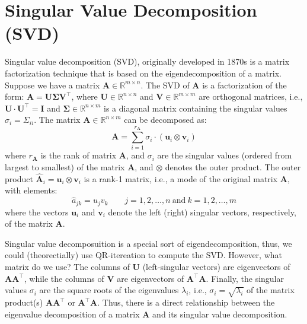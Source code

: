 \documentclass{article}[11pt]
\def\R{\mathbb{R}}
\begin{document}
\section{Singular Value Decomposition (SVD)}
Singular value decomposition (SVD), originally developed in 1870s \citep{Stewart:1993} is a matrix factorization technique that is based on the eigendecomposition of a matrix.
Suppose we have a matrix $\mathbf{A} \in \R^{m \times n}$. The SVD of $\mathbf{A}$ is a factorization of the form: $\mathbf{A} = \mathbf{U}\mathbf{\Sigma}\mathbf{V}^{\top}$, where
$\mathbf{U}\in\mathbb{R}^{n\times{n}}$ and $\mathbf{V}\in\mathbb{R}^{m\times{m}}$ are orthogonal matrices, i.e., $\mathbf{U}\cdot\mathbf{U}^{\top} = \mathbf{I}$ and $\mathbf{\Sigma}\in\mathbb{R}^{n\times{m}}$ is a diagonal matrix containing 
the singular values $\sigma_{i}=\Sigma_{ii}$. The matrix $\mathbf{A}\in\mathbb{R}^{n\times{m}}$ can be decomposed as:
\begin{equation*}
\mathbf{A} = \sum_{i=1}^{r_{\mathbf{A}}}\sigma_{i}\cdot\left(\mathbf{u}_{i}\otimes\mathbf{v}_{i}\right)
\end{equation*}
where $r_{\mathbf{A}}$ is the rank of matrix $\mathbf{A}$, and $\sigma_{i}$ are the singular values (ordered from largest to smallest) of the matrix $\mathbf{A}$,
and $\otimes$ denotes the outer product. 
The outer product $\hat{\mathbf{A}}_{i} = \mathbf{u}_{i}\otimes\mathbf{v}_{i}$ is a rank-1 matrix, i.e., a mode of the original matrix $\mathbf{A}$,  with elements: 
\begin{equation*}
\hat{a}_{jk} = u_{j}v_{k}\qquad{j=1,2,\dots,n~\text{and}~k=1,2,\dots,m}
\end{equation*}
where the vectors $\mathbf{u}_{i}$ and $\mathbf{v}_{i}$ denote the left (right) singular vectors, respectively, of the matrix $\mathbf{A}$.

Singular value decomposuition is a special sort of eigendecomposition, thus, we could (theorectially) use QR-itereation to compute the SVD. However, what matrix do we use?
The columns of $\mathbf{U}$ (left-singular vectors) are eigenvectors of $\mathbf{A}\mathbf{A}^{\top}$, 
while the columns of $\mathbf{V}$ are eigenvectors of $\mathbf{A}^{\top}\mathbf{A}$.
Finally, the singular values $\sigma_{i}$ are the square roots of the eigenvalues $\lambda_{i}$, i.e., $\sigma_{i} = \sqrt{\lambda_{i}}$ of the matrix product(s) $\mathbf{A}\mathbf{A}^{\top}$ or $\mathbf{A}^{\top}\mathbf{A}$. 
Thus, there is a direct relationship between the eigenvalue decomposition of a matrix $\mathbf{A}$ and its singular value decomposition.
\end{document}
